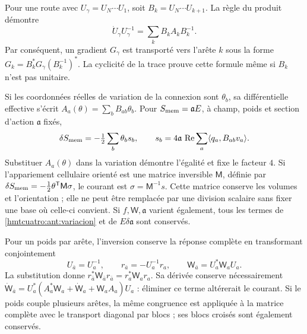 Pour une route avec \(U_\gamma=U_N\cdots U_1\), soit \(B_k=U_N\cdots U_{k+1}\). La règle du produit démontre
\begin{equation}
 \dot U_\gamma U_\gamma^{-1}
 =\sum_k B_kA_kB_k^{-1}.
 \label{hmtcuatro:ant:variacion-ruta}
\end{equation}
Par conséquent, un gradient \(G_\gamma\) est transporté vers l’arête \(k\) sous la forme \(G_k=B_k^*G_\gamma(B_k^{-1})^*\). La cyclicité de la trace prouve cette formule même si \(B_k\) n’est pas unitaire.

Si les coordonnées réelles de variation de la connexion sont \(\theta_b\), sa différentielle effective s’écrit \(A_a(\theta)=\sum_b B_{ab}\theta_b\). Pour \(S_{\rm mem}=\mathfrak a E\), à champ, poids et section d’action \(\mathfrak a\) fixés,
\begin{equation}
 \delta S_{\rm mem}=-\tfrac12\sum_b\theta_b s_b,\qquad
 s_b=4\mathfrak a\,\operatorname{Re}
          \sum_a\langle q_a,B_{ab}v_a\rangle .
 \label{hmtcuatro:ant:corriente-celular}
\end{equation}
Substituer \(A_a(\theta)\) dans la variation démontre l’égalité et fixe le facteur \(4\). Si l’appariement cellulaire orienté est une matrice inversible \(\mathsf M\), définie par \(\delta S_{\rm mem}=-\frac12\theta^{\mathsf T}\mathsf M\sigma\), le courant est \(\sigma=\mathsf M^{-1}s\). Cette matrice conserve les volumes et l’orientation ; elle ne peut être remplacée par une division scalaire sans fixer une base où celle-ci convient. Si \(f,\mathsf W,\mathfrak a\) varient également, tous les termes de \eqref{hmtcuatro:ant:variacion} et de \(E\delta\mathfrak a\) sont conservés.

Pour un poids par arête, l’inversion conserve la réponse complète en transformant conjointement
\[
 U_{\bar a}=U_a^{-1},\qquad
 r_{\bar a}=-U_a^{-1}r_a,\qquad
 \mathsf W_{\bar a}=U_a^*\mathsf W_aU_a .
\]
La substitution donne \(r_{\bar a}^*\mathsf W_{\bar a}r_{\bar a}=r_a^*\mathsf W_ar_a\). Sa dérivée conserve nécessairement \(\dot{\mathsf W}_{\bar a}
=U_a^*(A_a^*\mathsf W_a+\dot{\mathsf W}_a+\mathsf W_aA_a)U_a\) : éliminer ce terme altérerait le courant. Si le poids couple plusieurs arêtes, la même congruence est appliquée à la matrice complète avec le transport diagonal par blocs ; ses blocs croisés sont également conservés.


